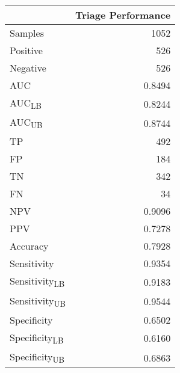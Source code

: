 \begin{tabular}{lr}
\toprule
 & Triage Performance \\
\midrule
Samples & 1052 \\
Positive & 526 \\
Negative & 526 \\
AUC & 0.8494 \\
AUC\textsubscript{LB} & 0.8244 \\
AUC\textsubscript{UB} & 0.8744 \\
TP & 492 \\
FP & 184 \\
TN & 342 \\
FN & 34 \\
NPV & 0.9096 \\
PPV & 0.7278 \\
Accuracy & 0.7928 \\
Sensitivity & 0.9354 \\
Sensitivity\textsubscript{LB} & 0.9183 \\
Sensitivity\textsubscript{UB} & 0.9544 \\
Specificity & 0.6502 \\
Specificity\textsubscript{LB} & 0.6160 \\
Specificity\textsubscript{UB} & 0.6863 \\
\bottomrule
\end{tabular}
